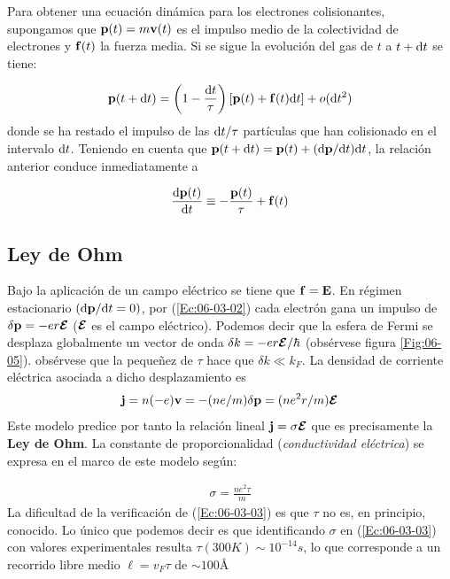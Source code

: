 Para obtener una ecuación dinámica para los electrones colisionantes, supongamos que $\mathbf{p}(t)= m \mathbf{v}(t)$ es el impulso medio de la colectividad de electrones y $\mathbf{f}(t)$ la fuerza media. Si se sigue la evolución del gas de $t$ a $t+\mathrm{d} t$ se tiene:

\begin{equation}
	\mathbf{p} (t+\mathrm{d} t) = \left( 1-\frac{\mathrm{d} t}{\tau} \right) \left[ \mathbf{p}(t)+\mathbf{f}(t)\mathrm{d} t \right] + o(\mathrm{d} t^2)
\end{equation}
donde se ha restado el impulso de las $\mathrm{d} t/\tau$ partículas que han colisionado en el intervalo $\mathrm{d} t$. Teniendo en cuenta que $\mathbf{p}(t+\mathrm{d} t)=\mathbf{p}(t)+(\mathrm{d} \mathbf{p} / \mathrm{d} t)\mathrm{d} t$, la relación anterior conduce inmediatamente a 

\begin{equation}
	\frac{\mathrm{d} \mathbf{p}(t)}{\mathrm{d} t} \equiv - \frac{\mathbf{p}(t)}{\tau} +  \mathbf{f}(t) \label{Ec:06-03-02}
\end{equation}



\subsection{Ley de Ohm}
Bajo la aplicación de un campo eléctrico se tiene que $\mathbf{f} = \mathbf{E}$. En régimen estacionario $(\mathrm{d} \mathbf{p} / \mathrm{d} t = 0)$, por (\ref{Ec:06-03-02}) cada electrón gana un impulso de $\delta \mathbf{p} = -er\boldsymbol{\mathcal{E}}$ ($\boldsymbol{\mathcal{E}}$ es el campo eléctrico). Podemos decir que la esfera de Fermi se desplaza globalmente un vector de onda $\delta k = -er\boldsymbol{\mathcal{E}} /\hbar$ (obsérvese figura \ref{Fig:06-05}). obsérvese que la pequeñez de $\tau$ hace que $\delta k \ll k_F$. La densidad de corriente eléctrica asociada a dicho desplazamiento es $$\mathbf{j}=n(-e)\mathbf{v}=-(ne/m)\delta \mathbf{p} = (ne^2 r/m)\boldsymbol{\mathcal{E}}$$  Este modelo predice por tanto la relación lineal $\mathbf{j}=\sigma \boldsymbol{\mathcal{E}}$ que es precisamente la \textbf{Ley de Ohm}. La constante de proporcionalidad (\textit{conductividad eléctrica}) se expresa en el marco de este modelo según:

\begin{eqnarray}
	\sigma = \frac{ne^2\tau}{m} \label{Ec:06-03-03}
\end{eqnarray}
La dificultad de la verificación de (\ref{Ec:06-03-03}) es que $\tau$ no es, en principio, conocido. Lo único que podemos decir es que identificando $\sigma$ en (\ref{Ec:06-03-03}) con valores experimentales resulta $\tau(300\unit{K})\sim10^{-14}\unit{s}$, lo que corresponde a un recorrido libre medio $\ell = v_F \tau$ de $\sim 100 \unit{\angstrom}$

